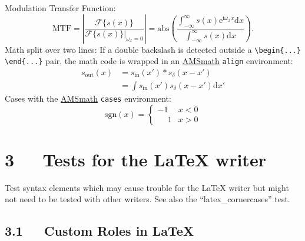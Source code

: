 \documentclass[a4paper]{article}
\begin{document}

Modulation Transfer Function:
%
\begin{equation*}
\text{MTF} = \left|\frac{\mathcal{F}\{s(x)\}}
                        {\mathcal{F}\{ s(x)\} |_{\omega _{x}=0}}\right|
           = \mathrm{abs}\left(\frac
                 {\int _{-\infty }^{\infty }s(x) \mathrm{e}^{\mathrm{i}\omega _{x}x}\mathrm{d}{x}}
                 {\int _{-\infty }^{\infty }s(x)\mathrm{d}{x}}
             \right).
\end{equation*}
Math split over two lines: If a double backslash is detected outside a
\texttt{\textbackslash{}begin\{...\} \textbackslash{}end\{...\}} pair, the math code is wrapped in an \href{ftp://ftp.ams.org/ams/doc/amsmath/short-math-guide.pdf}{AMSmath}
\texttt{align} environment:
%
\begin{align*}
s_{\mathrm{out}}(x) & = s_{\mathrm{in}}(x') * s_\delta (x-x') \\
                    & = \int  s_{\mathrm{in}}(x')s_\delta (x-x')\mathrm{d}x'
\end{align*}
Cases with the \href{ftp://ftp.ams.org/ams/doc/amsmath/short-math-guide.pdf}{AMSmath} \texttt{cases} environment:
%
\begin{equation*}
\mathrm{sgn}(x) = \begin{cases}
                             -1 & x<0\\
                    \phantom{-} 1 & x>0
                  \end{cases}
\end{equation*}

\section{3   Tests for the LaTeX writer%
  \label{tests-for-the-latex-writer}%
}

Test syntax elements which may cause trouble for the LaTeX writer but might
not need to be tested with other writers. See also the
“latex\_cornercases” test.


\subsection{3.1   Custom Roles in LaTeX%
  \label{custom-roles-in-latex}%
}
\end{document}

